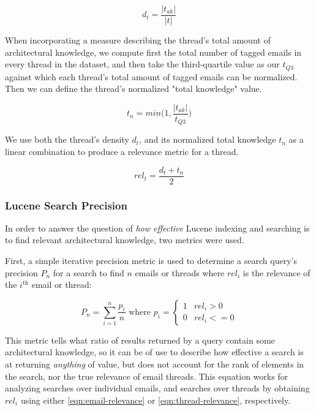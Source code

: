\documentclass[a4paper, 12pt]{article}
\begin{document}
			\begin{equation}
				\tag{Email Thread Density}
				d_t = \frac{|t_{ak}|}{|t|}
				\label{eqn:thread-density}
			\end{equation}
		
			When incorporating a measure describing the thread's total amount of architectural knowledge, we compute first the total number of tagged emails in every thread in the dataset, and then take the third-quartile value as our $ t_{Q3} $ against which each thread's total amount of tagged emails can be normalized. Then we can define the thread's normalized "total knowledge" value.
			
			\begin{equation}
				\tag{Email Thread Total Knowledge}
				t_n = min\Big(1, \frac{|t_{ak}|}{t_{Q3}}\Big)
				\label{eqn:thread-absolute-amount}
			\end{equation}
			
			We use both the thread's density $ d_t $, and its normalized total knowledge $ t_n $ as a linear combination to produce a relevance metric for a thread.
			
			\begin{equation}
				\tag{Email Thread Relevance}
				rel_t = \frac{d_t + t_n}{2}
				\label{eqn:thread-relevance}
			\end{equation}
		
		\subsubsection{Lucene Search Precision}
			In order to answer the question of \textit{how effective} Lucene indexing and searching is to find relevant architectural knowledge, two metrics were used.
			
			First, a simple iterative precision metric is used to determine a search query's precision $ P_n $ for a search to find $ n $ emails or threads where $ rel_i $ is the relevance of the $ i^{\text{th}} $ email or thread:
			
			\begin{equation}
				\tag{Search Precision}
				P_n = \sum_{i = 1}^{n} \frac{p_i}{n}
				\text{ where } p_i =
				\begin{cases}
					1 & rel_i > 0 \\
					0 & rel_i <= 0
				\end{cases}
				\label{eqn:precision}
			\end{equation}
		
			This metric tells what ratio of results returned by a query contain some architectural knowledge, so it can be of use to describe how effective a search is at returning \textit{anything} of value, but does not account for the rank of elements in the search, nor the true relevance of email threads. This equation works for analyzing searches over individual emails, and searches over threads by obtaining $ rel_i $ using either \eqref{eqn:email-relevance} or \eqref{eqn:thread-relevance}, respectively.
			
\end{document}
